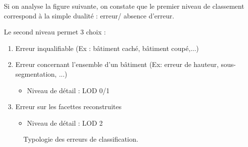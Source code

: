 \documentclass{themeensg}
\begin{document}
\begin{appendices} 
\label{beginappendices}
\label{annexeerreurs}


Si on analyse la figure suivante\footnotemark{}, on constate que le premier niveau de classement correspond à la simple dualité : erreur/ absence d'erreur.\newline

\noindent Le second niveau permet 3 choix : 
\begin{enumerate}
	\item Erreur inqualifiable (Ex : bâtiment caché, bâtiment coupé,...)
	\item Erreur concernant l'ensemble d'un bâtiment (Ex: erreur de hauteur, sous-segmentation, ...)
	\begin{itemize}[label=$\rightarrow$]
		\item Niveau de détail : LOD 0/1
	\end{itemize}
	\item Erreur sur les facettes reconstruites
	\begin{itemize}[label=$\rightarrow$]
		\item Niveau de détail : LOD 2
	\end{itemize}
\end{enumerate}


\begin{sidewaysfigure}[p]
   \begin{center}
    
	\caption[Typologie des erreurs de classification]{\label{fig::mindmap_errors}Typologie des erreurs de classification.}
   \end{center}
\end{sidewaysfigure}


\end{appendices} 
\end{document}
